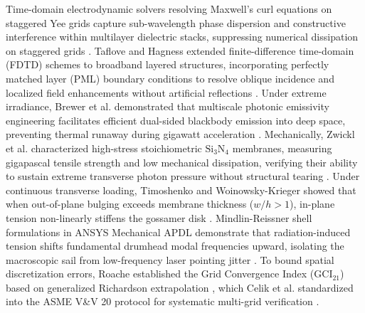 \documentclass[aps,prd,reprint,superscriptaddress,nofootinbib,floatfix]{revtex4-2}
\begin{document}
Time-domain electrodynamic solvers resolving Maxwell's curl equations on staggered Yee grids capture sub-wavelength phase dispersion and constructive interference within multilayer dielectric stacks, suppressing numerical dissipation on staggered grids \cite{ref16}. Taflove and Hagness extended finite-difference time-domain (FDTD) schemes to broadband layered structures, incorporating perfectly matched layer (PML) boundary conditions to resolve oblique incidence and localized field enhancements without artificial reflections \cite{ref17}. Under extreme irradiance, Brewer et al. demonstrated that multiscale photonic emissivity engineering facilitates efficient dual-sided blackbody emission into deep space, preventing thermal runaway during gigawatt acceleration \cite{ref18}. Mechanically, Zwickl et al. characterized high-stress stoichiometric $\mathrm{Si}_3\mathrm{N}_4$ membranes, measuring gigapascal tensile strength and low mechanical dissipation, verifying their ability to sustain extreme transverse photon pressure without structural tearing \cite{ref19}. Under continuous transverse loading, Timoshenko and Woinowsky-Krieger showed that when out-of-plane bulging exceeds membrane thickness ($w/h > 1$), in-plane tension non-linearly stiffens the gossamer disk \cite{ref20}. Mindlin-Reissner shell formulations in ANSYS Mechanical APDL demonstrate that radiation-induced tension shifts fundamental drumhead modal frequencies upward, isolating the macroscopic sail from low-frequency laser pointing jitter \cite{ref21}. To bound spatial discretization errors, Roache established the Grid Convergence Index ($\mathrm{GCI}_{21}$) based on generalized Richardson extrapolation \cite{ref22}, which Celik et al. standardized into the ASME V\&V 20 protocol for systematic multi-grid verification \cite{ref23}.
\end{document}

